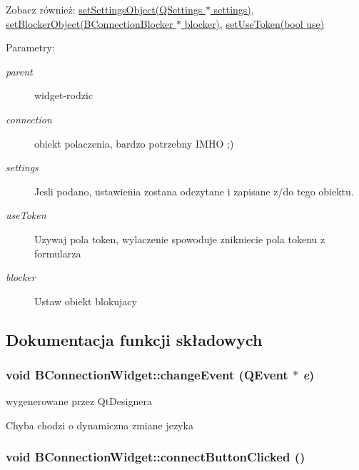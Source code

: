 \begin{Desc}
\item[Zobacz również:]\hyperlink{class_b_connection_widget_45070066f5da8af537f422d8b37c7d6e}{setSettingsObject(QSettings $\ast$ settings)}, \hyperlink{class_b_connection_widget_976657d9910495a76d16b7c90d0b54fc}{setBlockerObject(BConnectionBlocker $\ast$ blocker)}, \hyperlink{class_b_connection_widget_80d71ca868172dc623b9fa6c1ab938a6}{setUseToken(bool use)} \end{Desc}
\begin{Desc}
\item[Parametry:]
\begin{description}
\item[{\em parent}]widget-rodzic \item[{\em connection}]obiekt polaczenia, bardzo potrzebny IMHO ;) \item[{\em settings}]Jesli podano, ustawienia zostana odczytane i zapisane z/do tego obiektu. \item[{\em useToken}]Uzywaj pola token, wylaczenie spowoduje znikniecie pola tokenu z formularza \item[{\em blocker}]Ustaw obiekt blokujacy \end{description}
\end{Desc}


\subsection{Dokumentacja funkcji składowych}
\hypertarget{class_b_connection_widget_7396f6332ea7735a6a330fc11927d183}{
\subsubsection[{changeEvent}]{\setlength{\rightskip}{0pt plus 5cm}void BConnectionWidget::changeEvent (QEvent $\ast$ {\em e})}}
\label{class_b_connection_widget_7396f6332ea7735a6a330fc11927d183}


wygenerowane przez QtDesignera 

Chyba chodzi o dynamiczna zmiane jezyka \hypertarget{class_b_connection_widget_2eef5117ae0e5b76ca02a86d00fbd70a}{
\subsubsection[{connectButtonClicked}]{\setlength{\rightskip}{0pt plus 5cm}void BConnectionWidget::connectButtonClicked ()}}
\label{class_b_connection_widget_2eef5117ae0e5b76ca02a86d00fbd70a}


